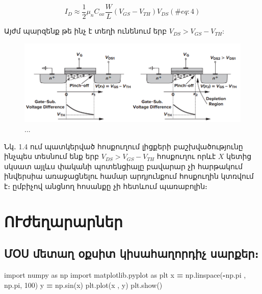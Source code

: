\documentclass[
]{book}
\newenvironment{Shaded}{\begin{snugshade}}{\end{snugshade}}
\newcommand{\DecValTok}[1]{\textcolor[rgb]{0.00,0.00,0.81}{#1}}
\newcommand{\ImportTok}[1]{#1}
\newcommand{\NormalTok}[1]{#1}
\newcommand{\OperatorTok}[1]{\textcolor[rgb]{0.81,0.36,0.00}{\textbf{#1}}}
\begin{document}
\begin{equation} 
  I_{D}  ≈ \frac{1}{2} μ_n C_{ox} \frac{W}{L} (V_{GS} - V_{TH}) V_{DS}
  (\#eq:4)
\end{equation}

Այժմ պարզենք թե ինչ է տեղի ունենում երբ \(V_{DS} > V_{GS} - V_{TH}\):

\begin{figure}

{\centering \includegraphics[width=1\linewidth]{imige/pinchoff} 

}

\caption{...}\label{fig:unnamed-chunk-4}
\end{figure}

Նկ․ 1.4 ում պատկերված հոսքուղում լիցքերի բաշխվածությունը ինչպես տեսնում
ենք երբ \(V_{DS} > V_{GS} - V_{TH}\) հոսքուղու որևէ \(X\) կետից սկսատ
այլևս փականի պոտենցիալը բավարար չի հարթակում ինվերսիա առաջացնելու համար
արդյունքում հոսքուղին կտռվում է։ ըմբիչով անցնող հոսանքը չի հետևում
պառաբոլին։

\hypertarget{ux578ux582ux56aux565ux572ux561ux580ux561ux580ux576ux565ux580}{%
\chapter{ՈՒժեղարարներ}\label{ux578ux582ux56aux565ux572ux561ux580ux561ux580ux576ux565ux580}}

\hypertarget{ux574ux585ux57d-ux574ux565ux57fux561ux572-ux585ux584ux57dux56bux57f-ux56fux56bux57dux561ux570ux561ux572ux578ux580ux564ux56bux579-ux57dux561ux580ux584ux565ux580}{%
\section{ՄՕՍ մետաղ օքսիտ կիսահաղորդիչ
սարքեր։}\label{ux574ux585ux57d-ux574ux565ux57fux561ux572-ux585ux584ux57dux56bux57f-ux56fux56bux57dux561ux570ux561ux572ux578ux580ux564ux56bux579-ux57dux561ux580ux584ux565ux580}}

\begin{Shaded}
\begin{Highlighting}[]
\ImportTok{import}\NormalTok{ numpy }\ImportTok{as}\NormalTok{ np}
\ImportTok{import}\NormalTok{ matplotlib.pyplot }\ImportTok{as}\NormalTok{ plt}
\NormalTok{x }\OperatorTok{=}\NormalTok{ np.linspace(}\OperatorTok{{-}}\NormalTok{np.pi , np.pi, }\DecValTok{100}\NormalTok{)}
\NormalTok{y }\OperatorTok{=}\NormalTok{ np.sin(x)}
\NormalTok{plt.plot(x , y)}
\NormalTok{plt.show()}
\end{Highlighting}
\end{Shaded}
\end{document}
